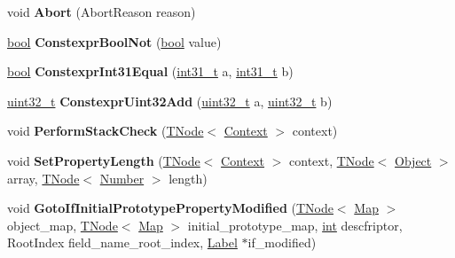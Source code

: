 \begin{DoxyCompactItemize}
void {\bfseries Abort} (Abort\+Reason reason)
\item 
\mbox{\label{classv8_1_1internal_1_1CodeStubAssembler_aafc812f84675d950104e25e0c3f1c14b}} 
\mbox{\hyperlink{classbool}{bool}} {\bfseries Constexpr\+Bool\+Not} (\mbox{\hyperlink{classbool}{bool}} value)
\item 
\mbox{\label{classv8_1_1internal_1_1CodeStubAssembler_a28384ee1082579a48c0023b1a48647ce}} 
\mbox{\hyperlink{classbool}{bool}} {\bfseries Constexpr\+Int31\+Equal} (\mbox{\hyperlink{classv8_1_1internal_1_1int31__t}{int31\+\_\+t}} a, \mbox{\hyperlink{classv8_1_1internal_1_1int31__t}{int31\+\_\+t}} b)
\item 
\mbox{\label{classv8_1_1internal_1_1CodeStubAssembler_ac4f26579497cb73e40e6f8173e4023ac}} 
\mbox{\hyperlink{classuint32__t}{uint32\+\_\+t}} {\bfseries Constexpr\+Uint32\+Add} (\mbox{\hyperlink{classuint32__t}{uint32\+\_\+t}} a, \mbox{\hyperlink{classuint32__t}{uint32\+\_\+t}} b)
\item 
\mbox{\label{classv8_1_1internal_1_1CodeStubAssembler_aa9aebfb87bb45e784c10b9cc15ecc0f7}} 
void {\bfseries Perform\+Stack\+Check} (\mbox{\hyperlink{classv8_1_1internal_1_1compiler_1_1TNode}{T\+Node}}$<$ \mbox{\hyperlink{classv8_1_1internal_1_1Context}{Context}} $>$ context)
\item 
\mbox{\label{classv8_1_1internal_1_1CodeStubAssembler_ad156a2ff30b9d8cd251f04cfd533f575}} 
void {\bfseries Set\+Property\+Length} (\mbox{\hyperlink{classv8_1_1internal_1_1compiler_1_1TNode}{T\+Node}}$<$ \mbox{\hyperlink{classv8_1_1internal_1_1Context}{Context}} $>$ context, \mbox{\hyperlink{classv8_1_1internal_1_1compiler_1_1TNode}{T\+Node}}$<$ \mbox{\hyperlink{classv8_1_1internal_1_1Object}{Object}} $>$ array, \mbox{\hyperlink{classv8_1_1internal_1_1compiler_1_1TNode}{T\+Node}}$<$ \mbox{\hyperlink{structv8_1_1internal_1_1UnionT}{Number}} $>$ length)
\item 
\mbox{\label{classv8_1_1internal_1_1CodeStubAssembler_a7cca85536cc9c294f0e06b2d599f321b}} 
void {\bfseries Goto\+If\+Initial\+Prototype\+Property\+Modified} (\mbox{\hyperlink{classv8_1_1internal_1_1compiler_1_1TNode}{T\+Node}}$<$ \mbox{\hyperlink{classv8_1_1internal_1_1Map}{Map}} $>$ object\+\_\+map, \mbox{\hyperlink{classv8_1_1internal_1_1compiler_1_1TNode}{T\+Node}}$<$ \mbox{\hyperlink{classv8_1_1internal_1_1Map}{Map}} $>$ initial\+\_\+prototype\+\_\+map, \mbox{\hyperlink{classint}{int}} descfriptor, Root\+Index field\+\_\+name\+\_\+root\+\_\+index, \mbox{\hyperlink{classv8_1_1internal_1_1compiler_1_1CodeAssemblerLabel}{Label}} $\ast$if\+\_\+modified)

\end{DoxyCompactItemize}
